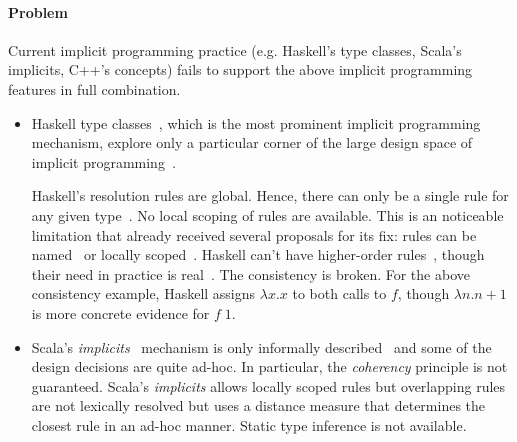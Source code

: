 
\paragraph{Problem}
Current implicit programming practice (e.g. Haskell's type classes,
Scala's implicits, C++'s concepts) fails to support 
the above implicit programming features in full combination.

\begin{itemize}

\item Haskell {type classes}~\cite{adhoc}, which is the
most prominent implicit programming mechanism, explore
only a particular corner of the large design space of implicit
programming~\cite{designspace}. 

Haskell's resolution rules are global. Hence, there can only be a
single rule for any given
type~\cite{named_instance,overloadingCamarao,implicit_explicit,modular}. No local scoping of rules are available. 
This is an noticeable limitation that already received several proposals for its
fix: rules can be named~\cite{named_instance} or locally
scoped~\cite{overloadingCamarao,implicit_explicit,modular}.
%
Haskell can't have higher-order rules~\cite{restricted}, though their
need in practice is real~\cite{sybclass, derivable, scalageneric}.
The consistency is broken. For the above consistency example, Haskell
assigns $\lambda x.x$ to both calls to $f$, though $\lambda n.n+1$ is
more concrete evidence for $f\;1$.


\item  Scala's \emph{implicits}~\cite{implicits}  mechanism is only informally
described~\cite{implicits,scala} and some of 
the design decisions are quite ad-hoc. In particular, 
the \textit{coherency} principle is not guaranteed.
Scala's \emph{implicits} allows locally scoped
rules but overlapping rules are not lexically resolved but uses a
distance measure that determines the closest rule in an ad-hoc
manner. Static type inference is not available. 


\end{itemize}
